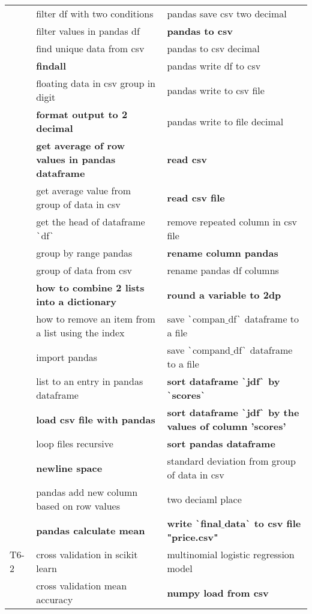\begin{longtable}{lLL}
& filter df with two conditions & pandas save csv two decimal \\
& filter values in pandas df & \textbf{pandas to csv} \\
& find unique data from csv & pandas to csv decimal \\
& \textbf{findall} & pandas write df to csv \\
& floating data in csv group in digit & pandas write to csv file \\
& \textbf{format output to 2 decimal} & pandas write to file decimal \\
& \textbf{get average of row values in pandas dataframe} & \textbf{read csv} \\
& get average value from group of data in csv & \textbf{read csv file} \\
& get the head of dataframe \texttt{\`}df\texttt{\`} & remove repeated column in csv file \\
& group by range pandas & \textbf{rename column pandas} \\
& group of data  from csv & rename pandas df columns \\
& \textbf{how to combine 2 lists into a dictionary} & \textbf{round a variable to 2dp} \\
& how to remove an item from a list using the index & save \texttt{\`}compan$\_$df\texttt{\`} dataframe to a file \\
& import pandas & save \texttt{\`}compand$\_$df\texttt{\`} dataframe to a file \\
& list to an entry in pandas dataframe & \textbf{sort dataframe \texttt{\`}jdf\texttt{\`} by \texttt{\`}scores\texttt{\`}} \\
& \textbf{load csv file with pandas} & \textbf{sort dataframe \texttt{\`}jdf\texttt{\`} by the values of column 'scores'} \\
& loop files recursive & \textbf{sort pandas dataframe} \\
& \textbf{newline space} & standard deviation from group of data in csv \\
& pandas add new column based on row values & two deciaml place \\
& \textbf{pandas calculate mean} & \textbf{write \texttt{\`}final$\_$data\texttt{\`} to csv file "price.csv"} \\
T6-2 & cross validation in scikit learn & multinomial logistic regression model \\
& cross validation mean accuracy & \textbf{numpy load from csv} \\

\end{longtable}

